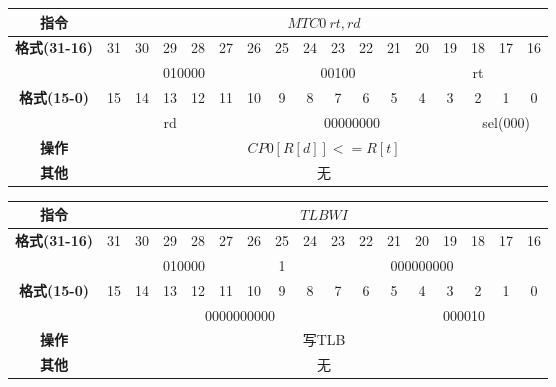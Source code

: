 \documentclass[11pt,utf8]{article}
\begin{document}
\begin{center}
\begin{tabular}{|c|c|c|c|c|c|c|c|c|c|c|c|c|c|c|c|c|}
\hline
\textbf{指令} & \multicolumn{16}{c|}{$MTC0~rt,rd$} \\
\hline
\multirow{2}{*}{\textbf{格式(31-16)}} & 31 & 30 & 29 & 28 & 27 & 26 & 25 & 24 & 23 & 22 & 21 & 20 & 19 & 18 & 17 & 16 \\ 
\cline{2-17}
& \multicolumn{6}{c|}{010000} & \multicolumn{5}{c|}{00100} & \multicolumn{5}{c|}{rt} \\
\hline
\multirow{2}{*}{\textbf{格式(15-0)}} & 15 & 14 & 13 & 12 & 11 & 10 & 9 & 8 & 7 & 6 & 5 & 4 & 3 & 2 & 1 & 0 \\
\cline{2-17}
& \multicolumn{5}{c|}{rd}& \multicolumn{8}{c|}{00000000}& \multicolumn{3}{c|}{sel(000)}\\
\hline
\textbf{操作} & \multicolumn{16}{c|}{$CP0[R[d]] <= R[t]$} \\
\hline
\textbf{其他} & \multicolumn{16}{c|}{无} \\
\hline
\end{tabular}
\end{center}

\begin{center}
\begin{tabular}{|c|c|c|c|c|c|c|c|c|c|c|c|c|c|c|c|c|}
\hline
\textbf{指令} & \multicolumn{16}{c|}{$TLBWI$} \\
\hline
\multirow{2}{*}{\textbf{格式(31-16)}} & 31 & 30 & 29 & 28 & 27 & 26 & 25 & 24 & 23 & 22 & 21 & 20 & 19 & 18 & 17 & 16 \\ 
\cline{2-17}
& \multicolumn{6}{c|}{010000} & 1 & \multicolumn{9}{c|}{000000000} \\
\hline
\multirow{2}{*}{\textbf{格式(15-0)}} & 15 & 14 & 13 & 12 & 11 & 10 & 9 & 8 & 7 & 6 & 5 & 4 & 3 & 2 & 1 & 0 \\
\cline{2-17}
& \multicolumn{10}{c|}{0000000000}& \multicolumn{6}{c|}{000010}\\
\hline
\textbf{操作} & \multicolumn{16}{c|}{写TLB} \\
\hline
\textbf{其他} & \multicolumn{16}{c|}{无} \\
\hline
\end{tabular}
\end{center}
\end{document}
